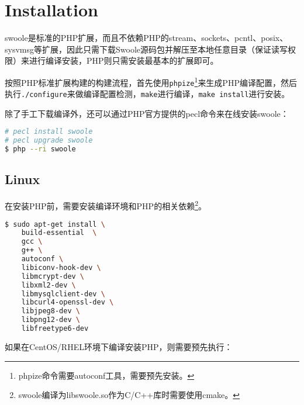\chapter{Installation}

swoole是标准的PHP扩展，而且不依赖PHP的stream、sockets、pcntl、posix、sysvmsg等扩展，因此只需下载Swoole源码包并解压至本地任意目录（保证读写权限）来进行编译安装，PHP则只需安装最基本的扩展即可。

按照PHP标准扩展构建的构建流程，首先使用\texttt{phpize}\footnote{phpize命令需要autoconf工具，需要预先安装。}来生成PHP编译配置，然后执行\texttt{./configure}来做编译配置检测，\texttt{make}进行编译，\texttt{make install}进行安装。

除了手工下载编译外，还可以通过PHP官方提供的pecl命令来在线安装swoole：

\begin{lstlisting}[language=bash]
# pecl install swoole
# pecl upgrade swoole
$ php --ri swoole
\end{lstlisting}



\section{Linux}


在安装PHP前，需要安装编译环境和PHP的相关依赖\footnote{swoole编译为libswoole.so作为C/C++库时需要使用cmake。}。



\begin{lstlisting}[language=bash]
$ sudo apt-get install \
	build-essential  \
	gcc \
	g++ \
	autoconf \
	libiconv-hook-dev \
	libmcrypt-dev \
	libxml2-dev \
	libmysqlclient-dev \
	libcurl4-openssl-dev \
	libjpeg8-dev \
	libpng12-dev \
	libfreetype6-dev
\end{lstlisting}

如果在CentOS/RHEL环境下编译安装PHP，则需要预先执行：



